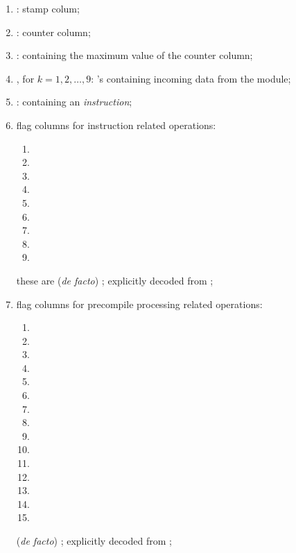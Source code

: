 \begin{enumerate}
	\item \oobStamp{}:
		stamp colum;
	\item \ct{}:
		counter column;
	\item \maxCt{}:
		\ccc{} containing the maximum value of the counter column;
	\item {}, for $k = 1, 2, \dots, 9$: \godGiven{}
		\ccc{}'s containing incoming data from the \hubMod{} module;
	\item \oobInstruction{}: \godGiven{}
		\ccc{} containing an \emph{\oobMod{} instruction};
	\item
		flag columns for \evm{} instruction related \oobMod{} operations:
		\begin{multicols}{3}
			\begin{enumerate}
				\item \oobInstIsJump{}
				\item \oobInstIsJumpI{}
				\item \oobInstIsRdc{}
				\item \oobInstIsCdl{}
				\item \oobInstIsXcall{}
				\item \oobInstIsCall{}
				\item \oobInstIsCreate{}
				\item \oobInstIsSstore{}
				\item \oobInstIsDeployment{}
			\end{enumerate}
		\end{multicols}
		these are (\emph{de facto}) \ccbc{}; explicitly decoded from \oobInst{XXX};
	\item 
		flag columns for precompile processing related \oobMod{} operations:
		\begin{multicols}{3}
			\begin{enumerate}
				\item \oobInstIsEcrecover{}
				\item \oobInstIsShaTwo{}
				\item \oobInstIsRipemd{}
				\item \oobInstIsIdentity{}
				\item \oobInstIsEcadd{}
				\item \oobInstIsEcmul{}
				\item \oobInstIsEcpairing{}
				\item \oobInstIsBlakeCds{}
				\item \oobInstIsBlakeParams{}
				\item \oobInstIsModexpCds{}
				\item \oobInstIsModexpXbs{}
				\item \oobInstIsModexpLead{}
				\item \oobInstIsModexpPricing{}
				\item \oobInstIsModexpExtract{}
				\item[\vspace{\fill}]
			\end{enumerate}
		\end{multicols}
		(\emph{de facto}) \ccbc{}; explicitly decoded from ;
\end{enumerate}

